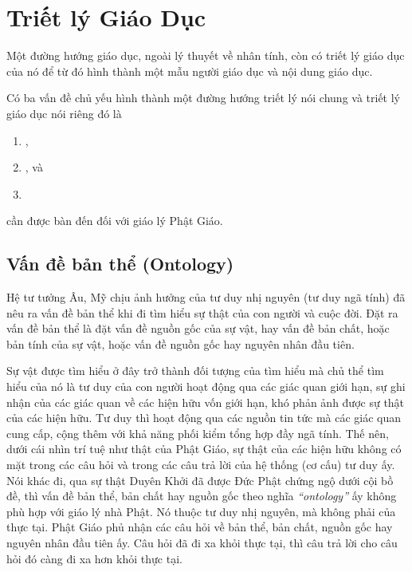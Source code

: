 \chapter{Triết lý Giáo Dục} %
\label{cha:triet_ly_giao_duc}

Một đường hướng giáo dục, ngoài lý thuyết về nhân tính, còn có triết lý giáo dục của nó để từ đó hình thành một mẫu người giáo dục và nội dung giáo dục.

Có ba vấn đề chủ yếu hình thành một đường hướng triết lý nói chung và triết lý giáo dục nói riêng đó là

\begin{enumerate}[label=\itshape\arabic*\upshape/]
    \item \emph{},
    \item \emph{}, và
    \item \emph{}
\end{enumerate}

cần được bàn đến đối với giáo lý Phật Giáo.

\section{Vấn đề bản thể (Ontology)} %
\label{sec:van_de_ban_the}

Hệ tư tưởng Âu, Mỹ chịu ảnh hưởng của tư duy nhị nguyên (tư duy ngã tính) đã nêu ra vấn đề bản thể khi đi tìm hiểu sự thật của con người và cuộc đời. Đặt ra vấn đề bản thể là đặt vấn đề nguồn gốc của sự vật, hay vấn đề bản chất, hoặc bản tính của sự vật, hoặc vấn đề nguồn gốc hay nguyên nhân đầu tiên.

Sự vật được tìm hiểu ở đây trở thành đối tượng của tìm hiểu mà chủ thể tìm hiểu của nó là tư duy của con người hoạt động qua các giác quan giới hạn, sự ghi nhận của các giác quan về các hiện hữu vốn giới hạn, khó phản ảnh được sự thật của các hiện hữu. Tư duy thì hoạt động qua các nguồn tin tức mà các giác quan cung cấp, cộng thêm với khả năng phối kiểm tổng hợp đầy ngã tính. Thế nên, dưới cái nhìn trí tuệ như thật của Phật Giáo, sự thật của các hiện hữu không có mặt trong các câu hỏi và trong các câu trả lời của hệ thống (cơ cấu) tư duy ấy. Nói khác đi, qua sự thật Duyên Khởi đã được Đức Phật chứng ngộ dưới cội bồ đề, thì vấn đề bản thể, bản chất hay nguồn gốc theo nghĩa \emph{``ontology''} ấy không phù hợp với giáo lý nhà Phật. Nó thuộc tư duy nhị nguyên, mà không phải của thực tại. Phật Giáo phủ nhận các câu hỏi về bản thể, bản chất, nguồn gốc hay nguyên nhân đầu tiên ấy. Câu hỏi đã đi xa khỏi thực tại, thì câu trả lời cho câu hỏi đó càng đi xa hơn khỏi thực tại.

